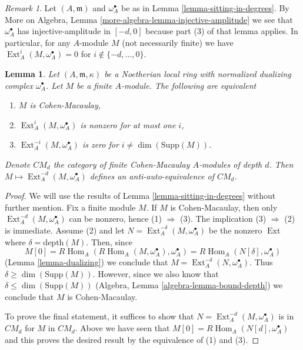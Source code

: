 \documentclass{stacks-project}
\theoremstyle{plain}
\newtheorem{lemma}[subsection]{Lemma}
\theoremstyle{definition}
\theoremstyle{remark}
\newtheorem{remark}[subsection]{Remark}
\numberwithin{equation}{subsection}
\def\Hom{\mathop{\mathrm{Hom}}\nolimits}
\def\Ext{\mathop{\mathrm{Ext}}\nolimits}
\begin{document}
\begin{remark}
\label{remark-vanishing-for-arbitrary-modules}
Let $(A, \mathfrak m)$ and $\omega_A^\bullet$ be as in
Lemma \ref{lemma-sitting-in-degrees}.
By More on Algebra, Lemma \ref{more-algebra-lemma-injective-amplitude}
we see that $\omega_A^\bullet$ has injective-amplitude in $[-d, 0]$
because part (3) of that lemma applies.
In particular, for any $A$-module $M$ (not necessarily finite) we have
$\Ext^i_A(M, \omega_A^\bullet) = 0$ for $i \not \in \{-d, \ldots, 0\}$.
\end{remark}

\begin{lemma}
\label{lemma-local-CM}
Let $(A, \mathfrak m, \kappa)$ be a Noetherian local ring
with normalized dualizing complex $\omega_A^\bullet$. Let $M$
be a finite $A$-module. The following are equivalent
\begin{enumerate}
\item $M$ is Cohen-Macaulay,
\item $\Ext^i_A(M, \omega_A^\bullet)$ is nonzero for at most one $i$,
\item $\Ext^{-i}_A(M, \omega_A^\bullet)$ is zero for
$i \not = \dim(\text{Supp}(M))$.
\end{enumerate}
Denote $CM_d$ the category of finite Cohen-Macaulay $A$-modules
of depth $d$. Then $M \mapsto \Ext^{-d}_A(M, \omega_A^\bullet)$
defines an anti-auto-equivalence of $CM_d$.
\end{lemma}

\begin{proof}
We will use the results of Lemma \ref{lemma-sitting-in-degrees}
without further mention. Fix a finite module $M$.
If $M$ is Cohen-Macaulay, then only
$\Ext^{-d}_A(M, \omega_A^\bullet)$ can be nonzero,
hence (1) $\Rightarrow$ (3).
The implication (3) $\Rightarrow$ (2) is immediate.
Assume (2) and let $N = \Ext^{-\delta}_A(M, \omega_A^\bullet)$
be the nonzero $\Ext$ where $\delta = \text{depth}(M)$. Then, since
$$
M[0] = R\Hom_A(R\Hom_A(M, \omega_A^\bullet), \omega_A^\bullet) =
R\Hom_A(N[\delta], \omega_A^\bullet)
$$
(Lemma \ref{lemma-dualizing})
we conclude that $M = \Ext_A^{-\delta}(N, \omega_A^\bullet)$.
Thus $\delta \geq \dim(\text{Supp}(M))$. However,
since we also know that $\delta \leq \dim(\text{Supp}(M))$
(Algebra, Lemma \ref{algebra-lemma-bound-depth}) we conclude that $M$ is
Cohen-Macaulay.

\medskip\noindent
To prove the final statement, it suffices to show that
$N = \Ext^{-d}_A(M, \omega_A^\bullet)$ is in $CM_d$
for $M$ in $CM_d$. Above we have seen that
$M[0] = R\Hom_A(N[d], \omega_A^\bullet)$ and this proves the
desired result by the equivalence of (1) and (3).
\end{proof}
\end{document}
